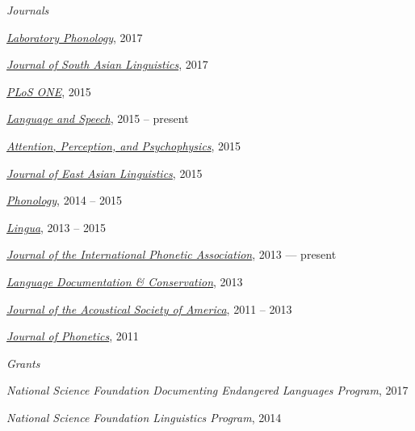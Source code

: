 \documentclass[10pt]{article}
\begin{document}
\begin{outerlist}

    \item[] \textit{Journals}%

      \begin{innerlist}
      \item
        \href{http://www.journal-labphon.org/}{\emph{Laboratory Phonology}}, 2017
      \item
        \href{http://jsal-journal.org/}{\emph{Journal of South Asian Linguistics}}, 2017
      \item
        \href{http://www.plosone.org/}{\emph{PLoS ONE}}, 2015
      \item
        \href{http://las.sagepub.com}{\emph{Language
            and Speech}}, 2015 -- present
      \item
        \href{http://www.springer.com/psychology/cognitive+psychology/journal/13414}{\emph{Attention,
            Perception, and Psychophysics}}, 2015
      \item
        \href{http://link.springer.com/journal/10831}{\emph{Journal of East Asian Linguistics}},
        2015
      \item
        \href{http://journals.cambridge.org/action/displayJournal?jid=PHO}{\emph{Phonology}},
        2014 -- 2015
      \item \href{http://www.journals.elsevier.com/lingua/}{\emph{Lingua}}, 2013 -- 2015
        \item
          \href{http://journals.cambridge.org/action/displayJournal?jid=IPA}{\emph{Journal
              of the International Phonetic Association}}, 2013 --- present
        \item \href{http://nflrc.hawaii.edu/ldc/}{\emph{Language Documentation \& Conservation}}, 2013
        \item \href{http://asadl.org/jasa/}{\emph{Journal of the Acoustical Society of America}}, 2011 -- 2013
        \item \href{http://www.journals.elsevier.com/journal-of-phonetics/}{\emph{Journal of Phonetics}}, 2011
      \end{innerlist}

    \item[] \textit{Grants}%

      \begin{innerlist}
      \item \emph{National Science Foundation Documenting Endangered Languages Program}, 2017
      \item \emph{National Science Foundation Linguistics Program}, 2014
      \end{innerlist}


\end{outerlist}
\end{document}

